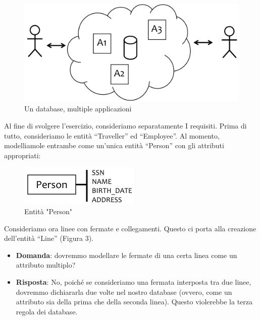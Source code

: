 \begin{center}
\begin{figure}[H]
\centering
\includegraphics[scale=1]{figures/1DBmAPP.png}
\caption{Un database, multiple applicazioni} 
\end{figure}
\end{center}

Al fine di svolgere l’esercizio, consideriamo separatamente I requisiti. Prima di tutto, consideriamo le entità “Traveller” ed “Employee”. Al momento, modelliamole entrambe come un’unica entità “Person” con gli attributi appropriati:

\begin{center}
\begin{figure}[H]
\centering
\includegraphics[scale=1]{figures/person_entity.png}
\caption{Entità "Person"} 
\end{figure}
\end{center}

Consideriamo ora linee con fermate e collegamenti. Questo ci porta alla creazione dell’entità “Line” (Figura 3).

\begin{itemize}

\item{\textbf{Domanda}}: dovremmo modellare le fermate di una certa linea come un attributo multiplo?
\item{\textbf{Risposta}}: No, poiché se consideriamo una fermata interposta tra due linee, dovremmo dichiararla due volte nel nostro database (ovvero, come un attributo sia della prima che della seconda linea). Questo violerebbe la terza regola dei database.

\end{itemize}

